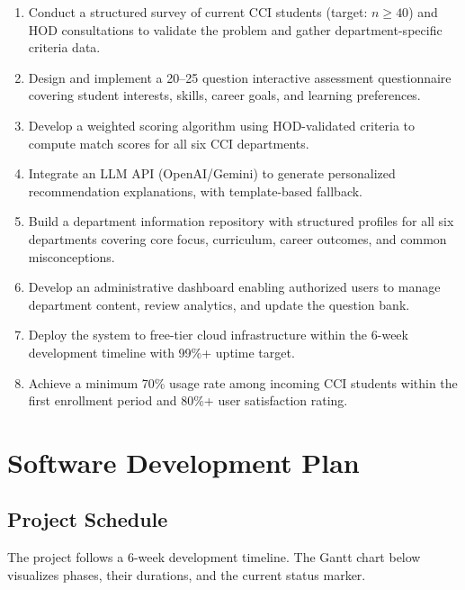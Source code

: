 ﻿\documentclass[12pt, a4paper]{article}
\begin{document}
\begin{enumerate}[leftmargin=1.5em, itemsep=4pt]
    \item Conduct a structured survey of current CCI students (target: $n \geq 40$) and HOD consultations to validate the problem and gather department-specific criteria data.
    \item Design and implement a 20--25 question interactive assessment questionnaire covering student interests, skills, career goals, and learning preferences.
    \item Develop a weighted scoring algorithm using HOD-validated criteria to compute match scores for all six CCI departments.
    \item Integrate an LLM API (OpenAI/Gemini) to generate personalized recommendation explanations, with template-based fallback.
    \item Build a department information repository with structured profiles for all six departments covering core focus, curriculum, career outcomes, and common misconceptions.
    \item Develop an administrative dashboard enabling authorized users to manage department content, review analytics, and update the question bank.
    \item Deploy the system to free-tier cloud infrastructure within the 6-week development timeline with 99\%+ uptime target.
    \item Achieve a minimum 70\% usage rate among incoming CCI students within the first enrollment period and 80\%+ user satisfaction rating.
\end{enumerate}

\clearpage

\section{Software Development Plan}

\subsection{Project Schedule}

The project follows a 6-week development timeline. The Gantt chart below visualizes phases, their durations, and the current status marker.
\end{document}
